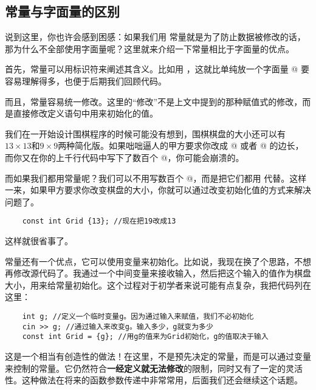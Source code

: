 \subsection*{常量与字面量的区别}
说到这里，你也许会感到困感：如果我们用 \lstinline@const@ 常量就是为了防止数据被修改的话，那为什么不全部使用字面量呢？这里就来介绍一下常量相比于字面量的优点。\par
首先，常量可以用标识符来阐述其含义。比如用 \lstinline@Grid@，这就比单纯放一个字面量 @ 要容易理解得多，也便于后期我们回顾代码。\par
而且，常量容易统一修改。这里的``修改''不是上文中提到的那种赋值式的修改，而是直接修改定义语句中用来初始化的值。\par
我们在一开始设计围棋程序的时候可能没有想到，围棋棋盘的大小还可以有$13\times13$和$9\times9$两种简化版。如果咄咄逼人的甲方要求你改成 @ 或者 @ 的边长，而你又在你的上千行代码中写下了数百个 @，你可能会崩溃的。\par
而如果我们都用常量呢？我们可以不用写数百个 @，而是把它们都用 \lstinline@Grid@ 代替。这样一来，如果甲方要求你改变棋盘的大小，你就可以通过改变初始化值的方式来解决问题了。
\begin{lstlisting}
    const int Grid {13}; //现在把19改成13
\end{lstlisting}
这样就很省事了。\par
常量还有一个优点，它可以使用变量来初始化。比如说，我现在换了个思路，不想再修改源代码了。我通过一个中间变量来接收输入，然后把这个输入的值作为棋盘大小，用来给常量初始化。这个过程对于初学者来说可能有点复杂，我把代码列在这里：
\begin{lstlisting}
    int g; //定义一个临时变量g。因为通过输入来赋值，我们不必初始化
    cin >> g; //通过输入来改变g。输入多少，g就变为多少
    const int Grid = {g}; //用g的值来为Grid初始化，g的值取决于输入
\end{lstlisting}
这是一个相当有创造性的做法！在这里，\lstinline@Grid@ 不是预先决定的常量，而是可以通过变量来控制的常量。它仍然符合\textbf{一经定义就无法修改}的限制，同时又有了一定的灵活性。这种做法在将来的函数参数传递中非常常用，后面我们还会继续这个话题。\par
